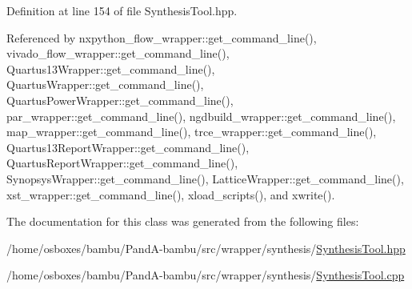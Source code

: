 Definition at line 154 of file Synthesis\+Tool.\+hpp.



Referenced by nxpython\+\_\+flow\+\_\+wrapper\+::get\+\_\+command\+\_\+line(), vivado\+\_\+flow\+\_\+wrapper\+::get\+\_\+command\+\_\+line(), Quartus13\+Wrapper\+::get\+\_\+command\+\_\+line(), Quartus\+Wrapper\+::get\+\_\+command\+\_\+line(), Quartus\+Power\+Wrapper\+::get\+\_\+command\+\_\+line(), par\+\_\+wrapper\+::get\+\_\+command\+\_\+line(), ngdbuild\+\_\+wrapper\+::get\+\_\+command\+\_\+line(), map\+\_\+wrapper\+::get\+\_\+command\+\_\+line(), trce\+\_\+wrapper\+::get\+\_\+command\+\_\+line(), Quartus13\+Report\+Wrapper\+::get\+\_\+command\+\_\+line(), Quartus\+Report\+Wrapper\+::get\+\_\+command\+\_\+line(), Synopsys\+Wrapper\+::get\+\_\+command\+\_\+line(), Lattice\+Wrapper\+::get\+\_\+command\+\_\+line(), xst\+\_\+wrapper\+::get\+\_\+command\+\_\+line(), xload\+\_\+scripts(), and xwrite().



The documentation for this class was generated from the following files\+:\begin{DoxyCompactItemize}
\item 
/home/osboxes/bambu/\+Pand\+A-\/bambu/src/wrapper/synthesis/\hyperlink{SynthesisTool_8hpp}{Synthesis\+Tool.\+hpp}\item 
/home/osboxes/bambu/\+Pand\+A-\/bambu/src/wrapper/synthesis/\hyperlink{SynthesisTool_8cpp}{Synthesis\+Tool.\+cpp}\end{DoxyCompactItemize}
